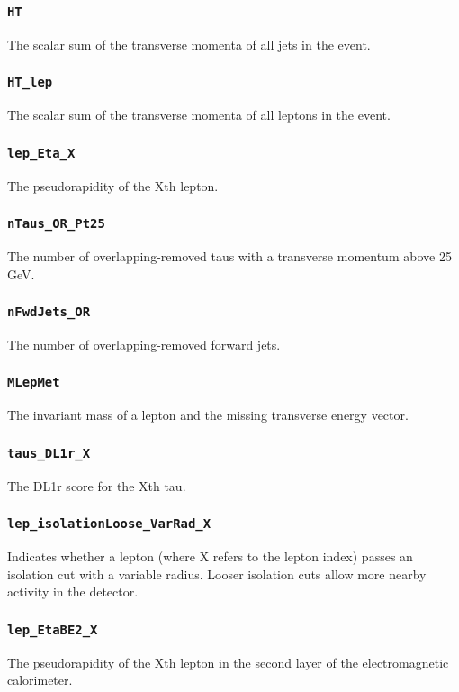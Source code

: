 \subsubsection{\texttt{HT}} The scalar sum of the transverse momenta of all jets in the event.

\subsubsection{\texttt{HT\_lep}} The scalar sum of the transverse momenta of all leptons in the event.

\subsubsection{\texttt{lep\_Eta\_X}} The pseudorapidity of the Xth lepton.

\subsubsection{\texttt{nTaus\_OR\_Pt25}} The number of overlapping-removed taus with a transverse momentum above 25 GeV.

\subsubsection{\texttt{nFwdJets\_OR}} The number of overlapping-removed forward jets.

\subsubsection{\texttt{MLepMet}} The invariant mass of a lepton and the missing transverse energy vector.

\subsubsection{\texttt{taus\_DL1r\_X}} The DL1r score for the Xth tau.

\subsubsection{\texttt{lep\_isolationLoose\_VarRad\_X}} Indicates whether a lepton (where X refers to the lepton index)
passes an isolation cut with a variable radius. Looser isolation cuts allow more nearby activity in the detector.

\subsubsection{\texttt{lep\_EtaBE2\_X}} The pseudorapidity of the Xth lepton in the second layer of the electromagnetic
calorimeter.

